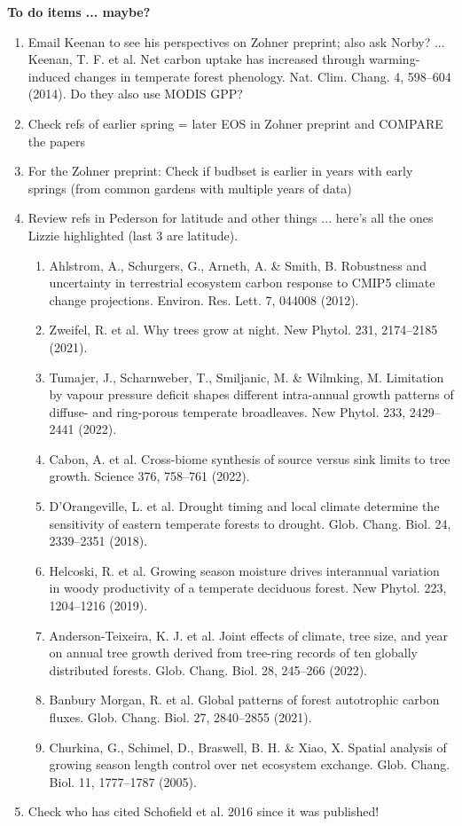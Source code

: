 \documentclass[11pt,letter]{article}
\begin{document}
\begin{enumerate}
{\bf To do items ... maybe?}
\begin{enumerate}
\item Email Keenan to see his perspectives on Zohner preprint; also ask Norby? %
 ... Keenan, T. F. et al. Net carbon uptake has increased through warming-induced changes in temperate forest phenology. Nat. Clim. Chang. 4, 598–604 (2014). Do they also use MODIS GPP?
\item Check refs of earlier spring = later EOS in Zohner preprint and COMPARE the papers
\item For the Zohner preprint: Check if budbset is earlier in years with early springs (from common gardens with multiple years of data)
\item Review refs in Pederson for latitude and other things ... here's all the ones Lizzie highlighted (last 3 are latitude).
\begin{enumerate}
\item Ahlstrom, A., Schurgers, G., Arneth, A. \& Smith, B. Robustness and uncertainty in terrestrial ecosystem carbon response to CMIP5 climate change projections. Environ. Res. Lett. 7, 044008 (2012).
\item Zweifel, R. et al. Why trees grow at night. New Phytol. 231, 2174–2185 (2021).
\item Tumajer, J., Scharnweber, T., Smiljanic, M. \& Wilmking, M. Limitation by vapour pressure
deficit shapes different intra-annual growth patterns of diffuse- and ring-porous
temperate broadleaves. New Phytol. 233, 2429–2441 (2022).
\item Cabon, A. et al. Cross-biome synthesis of source versus sink limits to tree growth.
Science 376, 758–761 (2022).
\item D'Orangeville, L. et al. Drought timing and local climate determine the sensitivity of
eastern temperate forests to drought. Glob. Chang. Biol. 24, 2339–2351 (2018).
\item Helcoski, R. et al. Growing season moisture drives interannual variation in woody productivity of a temperate deciduous forest. New Phytol. 223, 1204–1216 (2019).
\item Anderson-Teixeira, K. J. et al. Joint effects of climate, tree size, and year on annual tree growth derived from tree-ring records of ten globally distributed forests. Glob. Chang. Biol. 28, 245–266 (2022).
\item Banbury Morgan, R. et al. Global patterns of forest autotrophic carbon fluxes. Glob. Chang. Biol. 27, 2840–2855 (2021).
\item Churkina, G., Schimel, D., Braswell, B. H. \& Xiao, X. Spatial analysis of growing season length control over net ecosystem exchange. Glob. Chang. Biol. 11, 1777–1787 (2005).
\end{enumerate}
\item Check who has cited Schofield et al. 2016 since it was published!
\end{enumerate}



\end{enumerate}
\end{document}
